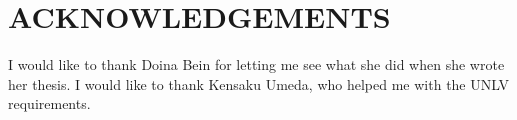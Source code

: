 
\chapter*{ACKNOWLEDGEMENTS}

I would like to thank Doina Bein for letting me see what she did
when she wrote her thesis.  I would like to thank Kensaku Umeda,
who helped me with the UNLV requirements.
